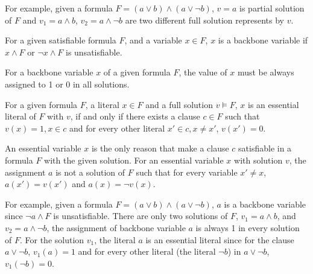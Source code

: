 For example, given a formula $F=(a\vee b)\wedge(a\vee \neg b)$, $v=a$ is partial solution of $F$ and $v_1=a\wedge b$, $v_2=a\wedge \neg b$ are two different full solution represents by $v$.


\begin{definition}
For a given satisfiable formula $F$, and a variable $x\in F$, $x$ is a backbone variable if $x\wedge F$ or $\neg x \wedge F$ is unsatisfiable.
\end{definition}

\begin{lemma}
For a backbone variable $x$ of a given formula $F$, the value of $x$ must be always assigned to 1 or 0 in all solutions.
\end{lemma}

\begin{definition}
For a given formula $F$, a literal $x\in F$ and a full solution $v\models F$, $x$ is an essential literal of $F$ with $v$, if and only if there exists a clause $c\in F$ such that $v(x)=1, x\in c$ and for every other literal $x'\in c, x\neq x'$, $v(x')=0$. 
\end{definition}

An essential variable $x$ is the only reason that make a clause $c$ satisfiable in a formula $F$ with the given solution. For an essential variable $x$ with solution $v$, the assignment $a$ is not a solution of $F$ such that for every variable $x' \neq x $, $a(x')=v(x')$ and $a(x)=\neg v(x)$.

For example, given a formula $F=(a\vee b)\wedge(a \vee \neg b)$, $a$ is a backbone variable since $\neg a \wedge F$ is unsatisfiable.
There are only two solutions of $F$, $v_1=a\wedge b$, and $v_2=a\wedge \neg b$, the assignment of backbone variable $a$ is always 1 in every solution of $F$. 
For the solution $v_1$, the literal $a$ is an essential literal since for the clause $a\vee \neg b$, $v_1(a)=1$ and for every other literal (the literal $\neg b$) in $a\vee \neg b$, $v_1(\neg b)=0$.